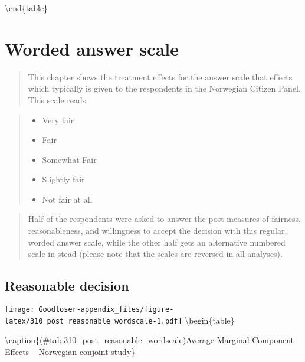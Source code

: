 \documentclass[
]{book}
\providecommand{\tightlist}{%
  \setlength{\itemsep}{0pt}\setlength{\parskip}{0pt}}
\begin{document}
\textbackslash end\{table\}

\hypertarget{worded-answer-scale}{%
\chapter{Worded answer scale}\label{worded-answer-scale}}

\begin{quote}
This chapter shows the treatment effects for the answer scale that effects which typically is given to the respondents in the Norwegian Citizen Panel. This scale reads:
\end{quote}

\begin{quote}
\begin{itemize}
\tightlist
\item
  Very fair\\
\item
  Fair\\
\item
  Somewhat Fair\\
\item
  Slightly fair\\
\item
  Not fair at all
\end{itemize}
\end{quote}

\begin{quote}
Half of the respondents were asked to answer the post measures of fairness, reasonableness, and willingness to accept the decision with this regular, worded answer scale, while the other half gets an alternative numbered scale in stead (please note that the scales are reversed in all analyses).
\end{quote}

\hypertarget{reasonable-decision-3}{%
\section{Reasonable decision}\label{reasonable-decision-3}}

\texttt{[image: Goodloser-appendix\_files/figure-latex/310\_post\_reasonable\_wordscale-1.pdf]} \textbackslash begin\{table\}

\textbackslash caption\{(\#tab:310\_post\_reasonable\_wordscale)Average Marginal Component Effects -- Norwegian conjoint study\}
\centering
\end{document}
